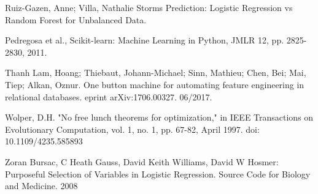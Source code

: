 \documentclass{llncs}
\begin{document}
\begin{thebibliography}{18}
Ruiz-Gazen, Anne; Villa, Nathalie Storms Prediction: Logistic Regression vs Random Forest for Unbalanced Data.

Pedregosa et al., Scikit-learn: Machine Learning in Python, JMLR 12, pp. 2825-2830, 2011.

Thanh Lam, Hoang; Thiebaut, Johann-Michael; Sinn, Mathieu; Chen, Bei; Mai, Tiep; Alkan, Oznur.  One button machine for automating feature engineering in relational databases. eprint arXiv:1706.00327. 06/2017.

Wolper, D.H. "No free lunch theorems for optimization," in IEEE Transactions on Evolutionary Computation, vol. 1, no. 1, pp. 67-82, April 1997. doi: 10.1109/4235.585893

Zoran Bursac, C Heath Gauss, David Keith Williams, David W Hosmer: Purposeful Selection of Variables in Logistic Regression. Source Code for Biology and Medicine. 2008

\end{thebibliography}
\end{document}
